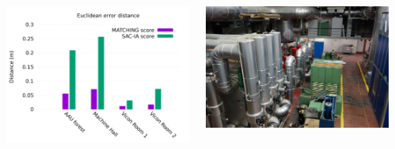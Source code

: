 \documentclass[28pt, a4paper, landscape]{tikzposter}
\begin{document}
\begin{columns}
{\begin{minipage}[t]{0.74\linewidth}
\begin{tikzfigure}
  \centering
  \includegraphics[width=\linewidth]{euc_dist_2.png}
\end{tikzfigure}
\end{minipage}
\begin{minipage}[t]{0.24\linewidth}
\begin{tikzfigure}
  \centering
  \includegraphics[width=\linewidth]{../img/eth_machine_room.jpg}
\end{tikzfigure}
\begin{tikzfigure}
  \centering

\end{tikzfigure}
\end{minipage}}
\end{columns}
\end{document}

